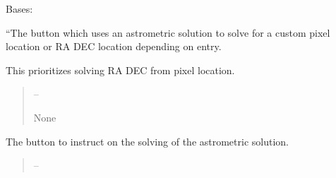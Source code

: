 \documentclass[letterpaper,11pt,english]{sphinxmanual}
\begin{document}
\begin{savenotes}\begin{fulllineitems}
\label{\detokenize{code/opihiexarata.gui.manual:opihiexarata.gui.manual.OpihiManualWindow}}
\pysigstartsignatures
{}
\pysigstopsignatures
\sphinxAtStartPar
Bases: 

\begin{savenotes}\begin{fulllineitems}
\label{\detokenize{code/opihiexarata.gui.manual:opihiexarata.gui.manual.OpihiManualWindow.__connect_push_button_astrometry_custom_solve}}
\pysigstartsignatures
{}
\pysigstopsignatures
\sphinxAtStartPar
“The button which uses an astrometric solution to solve for a
custom pixel location or RA DEC location depending on entry.

\sphinxAtStartPar
This prioritizes solving RA DEC from pixel location.
\begin{quote}\begin{description}
\sphinxAtStartPar
{} – 

\sphinxAtStartPar
None

\end{description}\end{quote}

\end{fulllineitems}\end{savenotes}


\begin{savenotes}\begin{fulllineitems}
\label{\detokenize{code/opihiexarata.gui.manual:opihiexarata.gui.manual.OpihiManualWindow.__connect_push_button_astrometry_solve_astrometry}}
\pysigstartsignatures
{}
\pysigstopsignatures
\sphinxAtStartPar
The button to instruct on the solving of the astrometric solution.
\begin{quote}\begin{description}
\sphinxAtStartPar
{} – 


\end{description}
\end{quote}
\end{fulllineitems}
\end{savenotes}
\end{fulllineitems}
\end{savenotes}
\end{document}
